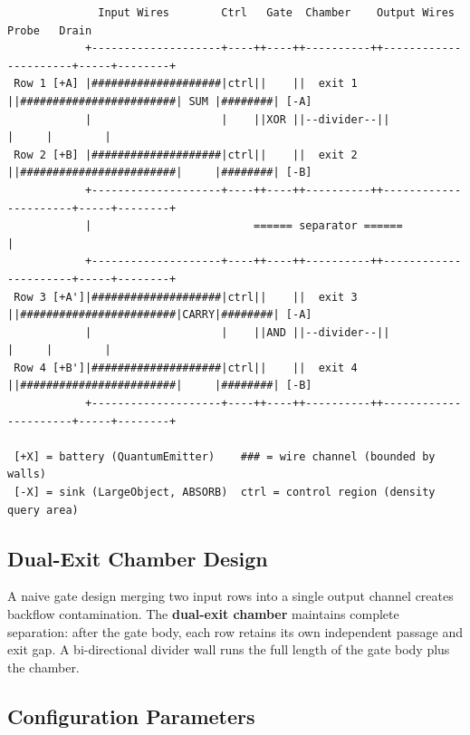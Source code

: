 \documentclass[11pt,a4paper]{article}
\begin{document}
\begin{verbatim}
              Input Wires        Ctrl   Gate  Chamber    Output Wires        Probe   Drain
            +--------------------+----++----++----------++----------------------+-----+--------+
 Row 1 [+A] |####################|ctrl||    ||  exit 1  ||########################| SUM |########| [-A]
            |                    |    ||XOR ||--divider--||                      |     |        |
 Row 2 [+B] |####################|ctrl||    ||  exit 2  ||########################|     |########| [-B]
            +--------------------+----++----++----------++----------------------+-----+--------+
            |                         ====== separator ======                                   |
            +--------------------+----++----++----------++----------------------+-----+--------+
 Row 3 [+A']|####################|ctrl||    ||  exit 3  ||########################|CARRY|########| [-A]
            |                    |    ||AND ||--divider--||                      |     |        |
 Row 4 [+B']|####################|ctrl||    ||  exit 4  ||########################|     |########| [-B]
            +--------------------+----++----++----------++----------------------+-----+--------+

 [+X] = battery (QuantumEmitter)    ### = wire channel (bounded by walls)
 [-X] = sink (LargeObject, ABSORB)  ctrl = control region (density query area)
\end{verbatim}

\subsection{Dual-Exit Chamber Design}

A naive gate design merging two input rows into a single output channel creates backflow contamination. The \textbf{dual-exit chamber} maintains complete separation: after the gate body, each row retains its own independent passage and exit gap. A bi-directional divider wall runs the full length of the gate body plus the chamber.

\subsection{Configuration Parameters}
\end{document}
